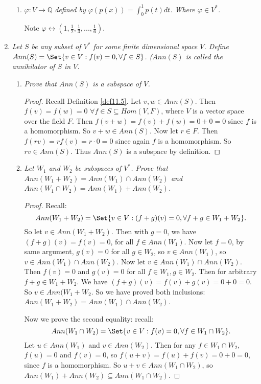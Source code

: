 \documentclass[9pt,reqno,twoside]{amsbook}
\theoremstyle{plain}
\numberwithin{section}{chapter}
\numberwithin{equation}{chapter}
\theoremstyle{definition}
\theoremstyle{remark}
\theoremstyle{plain}
\newcommand{\sub}{\subseteq}
\newcommand{\Q}{\mathbb{Q}}
\newcommand{\fracc}{\frac}
\renewcommand{\phi}{\varphi}
\begin{document}
\begin{enumerate}[label=\arabic*.]
\begin{enumerate}
\item \textit{$\phi:V \to \Q$ defined by $\phi(p(x)) = \int_0^1p(t)dt$. Where $\phi \in V^*$. }

Note $\phi \leftrightarrow (1,\fracc{1}{2},\fracc{1}{3},...,\fracc{1}{6})$. 
\end{enumerate}

\setcounter{enumi}{2}

\item \textit{Let $S$ be any subset of $V^*$ for some finite dimensional space $V$. Define $Ann(S) = \Set{v \in V:f(v) = 0,\forall f \in S}$. ($Ann(S)$ is called the annihilator of $S$ in $V$. }

\begin{enumerate}
\item \textit{Prove that $Ann(S)$ is a subspace of $V$. }

\begin{proof}
Recall Definition \ref{def11.5}. Let $v,w \in Ann(S)$. Then $f(v) = f(w) = 0$ $\forall f \in S \sub Hom(V,F)$, where $V$ is a vector space over the field $F$. Then $f(v + w) = f(v) + f(w) = 0 + 0 = 0$ since $f$ is a homomorphism. So $v + w \in Ann(S)$. Now let $r \in F$. Then $f(rv) = rf(v) = r\cdot 0 = 0$ since again $f$ is a homomorphism. So $rv \in Ann(S)$. Thus $Ann(S)$ is a subspace by definition. 
\end{proof}



\item \textit{Let $W_1$ and $W_2$ be subspaces of $V^*$. Prove that $Ann(W_1 + W_2) = Ann(W_1) \cap Ann(W_2)$ and $Ann(W_1 \cap W_2) = Ann(W_1) + Ann(W_2)$. }

\begin{proof}
Recall: 
$$
Ann(W_1 + W_2) = \Set{v \in V:(f + g)(v)  =0,\forall f + g \in W_1 + W_2}.
$$
So let $v \in Ann(W_1 + W_2)$. Then with $g = 0$, we have $(f + g)(v) = f(v) = 0$, for all $f \in Ann(W_1)$. Now let $f = 0$, by same argument, $g(v) = 0$ for all $g \in W_2$, so $v \in Ann(W_1)$, so $v \in Ann(W_1) \cap Ann(W_2)$. Now let $v \in Ann(W_1) \cap Ann(W_2)$. Then $f(v) = 0$ and $g(v) = 0$ for all $f \in W_1,g \in W_2$. Then for arbitrary $f + g \in W_1 + W_2$. We have $(f + g)(v) = f(v) + g(v) = 0 + 0 = 0$. So $v \in Ann(W_1 + W_2$. So we have proved both inclusions: $Ann(W_1 + W_2) = Ann(W_1) \cap Ann(W_2)$. 

Now we prove the second equality: recall:
$$
Ann(W_1 \cap W_2) = \Set{v \in V: f(v) = 0,\forall f \in W_1\cap W_2}.
$$
Let $u \in Ann(W_1)$ and $v \in Ann(W_2)$. Then for any $f \in W_1 \cap W_2$, $f(u) = 0$ and $f(v) = 0$, so $f(u + v) = f(u) + f(v) = 0 + 0 = 0$, since $f$ is a homomorphism. So $u + v \in Ann(W_1 \cap W_2)$, so $Ann(W_1) + Ann(W_2) \sub Ann(W_1 \cap W_2)$. 


\end{proof}
\end{enumerate}
\end{enumerate}
\end{document}
